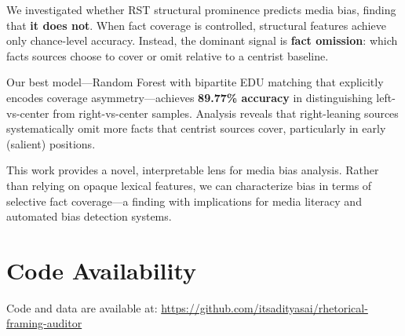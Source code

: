 \documentclass[11pt]{article}
\begin{document}
We investigated whether RST structural prominence predicts media bias, finding that \textbf{it does not}. When fact coverage is controlled, structural features achieve only chance-level accuracy. Instead, the dominant signal is \textbf{fact omission}: which facts sources choose to cover or omit relative to a centrist baseline.

Our best model---Random Forest with bipartite EDU matching that explicitly encodes coverage asymmetry---achieves \textbf{89.77\% accuracy} in distinguishing left-vs-center from right-vs-center samples. Analysis reveals that right-leaning sources systematically omit more facts that centrist sources cover, particularly in early (salient) positions.

This work provides a novel, interpretable lens for media bias analysis. Rather than relying on opaque lexical features, we can characterize bias in terms of selective fact coverage---a finding with implications for media literacy and automated bias detection systems.

\section*{Code Availability}

Code and data are available at: \url{https://github.com/itsadityasai/rhetorical-framing-auditor}



\end{document}
